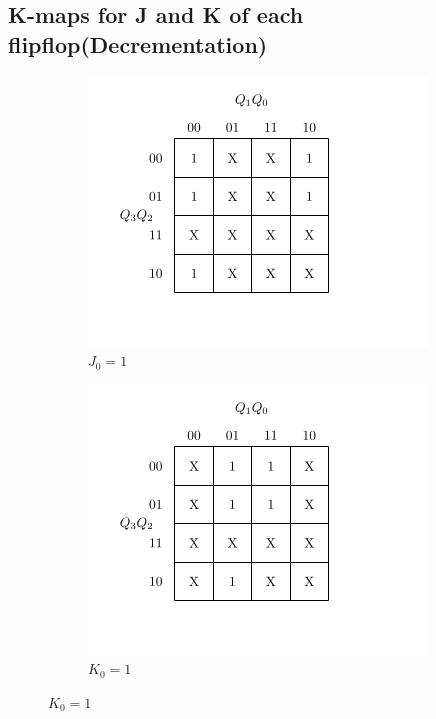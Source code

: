 \documentclass[a4paper,12pt]{article}
\begin{document}
\subsection{K-maps for J and K of each flipflop(Decrementation)}
\begin{figure}[H]
    \centering

    \begin{subfigure}[b]{0.45\textwidth}
        \centering
        \includegraphics[width=\linewidth]{dec/dj0.png}
        \caption{$J_0=1$}
    \end{subfigure}
    \hfill
    \begin{subfigure}[b]{0.45\textwidth}
        \centering
        \includegraphics[width=\linewidth]{dec/dk0.png}
        \caption{$K_0=1$}
    \end{subfigure}


\end{figure}
\end{document}
